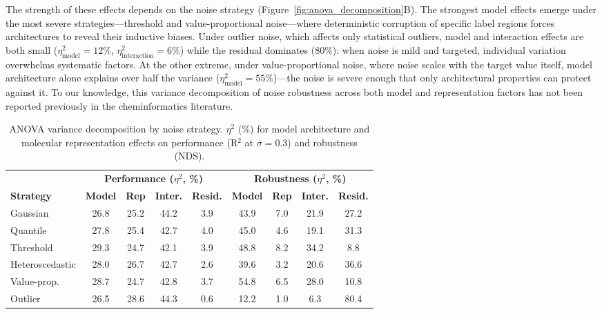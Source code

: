 \documentclass[pdflatex,sn-mathphys-num]{sn-jnl}%
\theoremstyle{thmstyleone}%
\theoremstyle{thmstyletwo}%
\theoremstyle{thmstylethree}%
\begin{document}
The strength of these effects depends on the noise strategy (Figure~\ref{fig:anova_decomposition}B). The strongest model effects emerge under the most severe strategies---threshold and value-proportional noise---where deterministic corruption of specific label regions forces architectures to reveal their inductive biases. Under outlier noise, which affects only statistical outliers, model and interaction effects are both small ($\eta^2_{\text{model}} = 12\%$, $\eta^2_{\text{interaction}} = 6\%$) while the residual dominates ($80\%$): when noise is mild and targeted, individual variation overwhelms systematic factors. At the other extreme, under value-proportional noise, where noise scales with the target value itself, model architecture alone explains over half the variance ($\eta^2_{\text{model}} = 55\%$)---the noise is severe enough that only architectural properties can protect against it. To our knowledge, this variance decomposition of noise robustness across both model and representation factors has not been reported previously in the cheminformatics literature.

\begin{table}[htbp]
\centering
\caption{ANOVA variance decomposition by noise strategy. $\eta^2$ (\%) for model architecture and molecular representation effects on performance (R$^2$ at $\sigma=0.3$) and robustness (NDS).}
\label{tab:anova_decomposition}
\small
\begin{tabular}{lcccccccc}
\toprule
& \multicolumn{4}{c}{\textbf{Performance ($\eta^2$, \%)}} & \multicolumn{4}{c}{\textbf{Robustness ($\eta^2$, \%)}} \\
\cmidrule(lr){2-5} \cmidrule(lr){6-9}
\textbf{Strategy} & \textbf{Model} & \textbf{Rep} & \textbf{Inter.} & \textbf{Resid.} & \textbf{Model} & \textbf{Rep} & \textbf{Inter.} & \textbf{Resid.} \\
\midrule
Gaussian        & 26.8 & 25.2 & 44.2 &  3.9 & 43.9 &  7.0 & 21.9 & 27.2 \\
Quantile        & 27.8 & 25.4 & 42.7 &  4.0 & 45.0 &  4.6 & 19.1 & 31.3 \\
Threshold       & 29.3 & 24.7 & 42.1 &  3.9 & 48.8 &  8.2 & 34.2 &  8.8 \\
Heteroscedastic & 28.0 & 26.7 & 42.7 &  2.6 & 39.6 &  3.2 & 20.6 & 36.6 \\
Value-prop.     & 28.7 & 24.7 & 42.8 &  3.7 & 54.8 &  6.5 & 28.0 & 10.8 \\
Outlier         & 26.5 & 28.6 & 44.3 &  0.6 & 12.2 &  1.0 &  6.3 & 80.4 \\
\bottomrule
\end{tabular}
\end{table}
\end{document}
